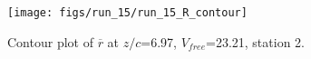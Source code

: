 \begin{figure}[H]
\centering
\texttt{[image: figs/run\_15/run\_15\_R\_contour]}
\caption{Contour plot of $\overline{r}$ at $z/c$=6.97, $V_{free}$=23.21, station 2.}
\label{fig:run_15_R_contour}
\end{figure}



